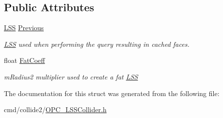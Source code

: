 \subsection*{Public Attributes}
\begin{DoxyCompactItemize}
\item 
\hyperlink{classLSS}{L\+SS} \hyperlink{structLSSCache_aa617d0f11615d556a68be403a71ca425}{Previous}\hypertarget{structLSSCache_aa617d0f11615d556a68be403a71ca425}{}\label{structLSSCache_aa617d0f11615d556a68be403a71ca425}

\begin{DoxyCompactList}\small\item\em \hyperlink{classLSS}{L\+SS} used when performing the query resulting in cached faces. \end{DoxyCompactList}\item 
float \hyperlink{structLSSCache_ad0b07b928f1fd59a62fb1491b5048192}{Fat\+Coeff}\hypertarget{structLSSCache_ad0b07b928f1fd59a62fb1491b5048192}{}\label{structLSSCache_ad0b07b928f1fd59a62fb1491b5048192}

\begin{DoxyCompactList}\small\item\em m\+Radius2 multiplier used to create a fat \hyperlink{classLSS}{L\+SS} \end{DoxyCompactList}\end{DoxyCompactItemize}


The documentation for this struct was generated from the following file\+:\begin{DoxyCompactItemize}
\item 
cmd/collide2/\hyperlink{OPC__LSSCollider_8h}{O\+P\+C\+\_\+\+L\+S\+S\+Collider.\+h}\end{DoxyCompactItemize}

